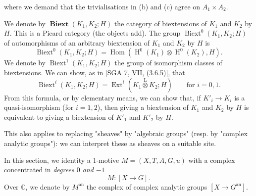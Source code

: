     where we demand that the trivialisations in (b) and (c) agree on \(A_1\times  A_2\).\par{}We denote by \(\operatorname {\textbf {Biext}}(K_1,K_2;H)\) the category of biextensions of \(K_1\) and \(K_2\) by \(H\).
    This is a Picard category (the objects add).
    The group \(\operatorname {Biext}^0(K_1,K_2;H)\) of automorphisms of an arbitrary biextension of \(K_1\) and \(K_2\) by \(H\) is
    \[       \operatorname {Biext}^0(K_1,K_2;H)       = \operatorname {Hom}(\operatorname {H}^0(K_1)\otimes \operatorname {H}^0(K_2),H).     \]
    We denote by \(\operatorname {Biext}^1(K_1,K_2;H)\) the group of isomorphism classes of biextensions.
    We can show, as in [SGA 7, VII, (3.6.5)], that
    \[       \operatorname {Biext}^i(K_1,K_2;H)       = \operatorname {Ext}^i(K_1\overset {\mathrm {L}}{\otimes } K_2;H)       \qquad \text {for }i=0,1.     \]
    From this formula, or by elementary means, we can show that, if \(K'_i\to  K_i\) is a quasi-isomorphism (for \(i=1,2\)), then giving a biextension of \(K_1\) and \(K_2\) by \(H\) is equivalent to giving a biextension of \(K'_1\) and \(K'_2\) by \(H\).\par{}This also applies to replacing "sheaves" by "algebraic groups" (resp. by "complex analytic groups"): we can interpret these as sheaves on a suitable site.\label{hodge-theory-iii-10.2.2}\par{}In this section, we identity a 1-motive \(M=(X,T,A,G,u)\) with a complex concentrated in \emph{degrees \(0\) and \(-1\)}
    \[       M\colon  [X\to  G].     \]
    Over \(\mathbb {C}\), we denote by \(M^\mathrm {an}\) the complex of complex analytic groups \([X\to  G^\mathrm {an}]\).
